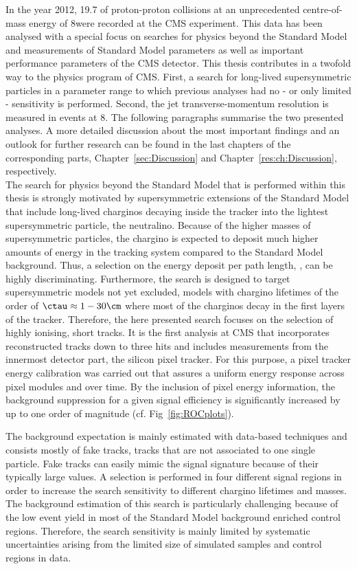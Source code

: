 In the year 2012, 19.7 \fbinv of proton-proton collisions at an unprecedented centre-of-mass energy of 8\tev were recorded at the CMS experiment.
This data has been analysed with a special focus on searches for physics beyond the Standard Model and measurements of Standard Model parameters as well as important performance parameters of the CMS detector.
This thesis contributes in a twofold way to the physics program of CMS.
First, a search for long-lived supersymmetric particles in a parameter range to which previous analyses had no - or only limited - sensitivity is performed. %
Second, the jet transverse-momentum resolution is measured in \GAMJET events at 8\tev.
The following paragraphs summarise the two presented analyses.
A more detailed discussion about the most important findings and an outlook for further research can be found in the last chapters of the corresponding parts, Chapter~\ref{sec:Discussion} and Chapter~\ref{res:ch:Discussion}, respectively.\\

The search for physics beyond the Standard Model that is performed within this thesis is strongly motivated by supersymmetric extensions of the Standard Model that include long-lived charginos decaying inside the tracker into the lightest supersymmetric particle, the neutralino.
Because of the higher masses of supersymmetric particles, the chargino is expected to deposit much higher amounts of energy in the tracking system compared to the Standard Model background.
Thus, a selection on the energy deposit per path length, \dedx, can be highly discriminating.
Furthermore, the search is designed to target supersymmetric models not yet excluded, \ie models with chargino lifetimes of the order of $\ctau \approx 1- 30\cm$ where most of the charginos decay in the first layers of the tracker.
Therefore, the here presented search focuses on the selection of highly ionising, short tracks.
It is the first analysis at CMS that incorporates reconstructed tracks down to three hits and includes \dedx measurements from the innermost detector part, the silicon pixel tracker.
For this purpose, a pixel tracker energy calibration was carried out that assures a uniform energy response across pixel modules and over time.
By the inclusion of pixel energy information, the background suppression for a given signal efficiency is significantly increased by up to one order of magnitude (cf. Fig~\ref{fig:ROCplots}).

The background expectation is mainly estimated with data-based techniques and consists mostly of fake tracks, \ie tracks that are not associated to one single particle. 
Fake tracks can easily mimic the signal signature because of their typically large \dedx values.
A selection is performed in four different signal regions in order to increase the search sensitivity to different chargino lifetimes and masses.
The background estimation of this search is particularly challenging because of the low event yield in most of the Standard Model background enriched control regions.
Therefore, the search sensitivity is mainly limited by systematic uncertainties arising from the limited size of simulated samples and control regions in data.

